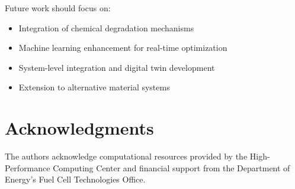 \documentclass[11pt,a4paper]{article}
\begin{document}
Future work should focus on:
\begin{itemize}
\item Integration of chemical degradation mechanisms
\item Machine learning enhancement for real-time optimization
\item System-level integration and digital twin development
\item Extension to alternative material systems
\end{itemize}

\section*{Acknowledgments}

The authors acknowledge computational resources provided by the High-Performance Computing Center and financial support from the Department of Energy's Fuel Cell Technologies Office.
\end{document}
